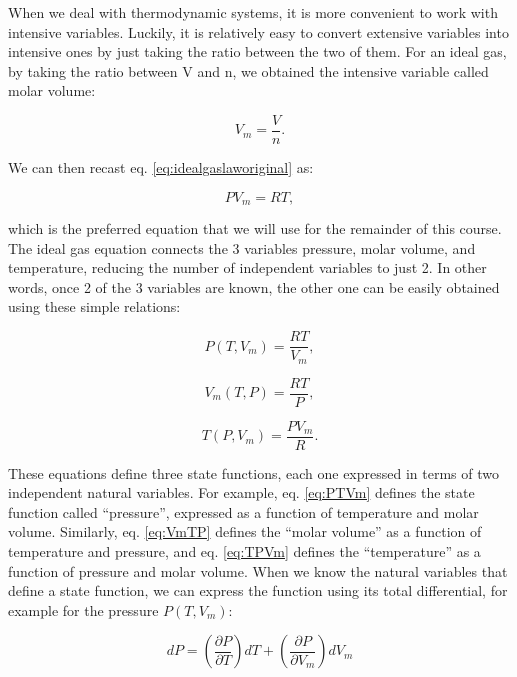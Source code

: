 \documentclass[
]{book}
\theoremstyle{definition}
\theoremstyle{definition}
\theoremstyle{definition}
\theoremstyle{remark}
\begin{document}
When we deal with thermodynamic systems, it is more convenient to work with intensive variables. Luckily, it is relatively easy to convert extensive variables into intensive ones by just taking the ratio between the two of them. For an ideal gas, by taking the ratio between V and n, we obtained the intensive variable called molar volume:

\begin{equation}
  V_m=\frac{V}{n}.   
  \label{eq:Vmdef}
\end{equation}

We can then recast eq. \eqref{eq:idealgaslaworiginal} as:

\begin{equation}
  PV_m=RT,
  \label{eq:idealgaslaw}
\end{equation}

which is the preferred equation that we will use for the remainder of this course.
The ideal gas equation connects the 3 variables pressure, molar volume, and temperature, reducing the number of independent variables to just 2. In other words, once 2 of the 3 variables are known, the other one can be easily obtained using these simple relations:

\begin{equation}
  P(T,V_m)=\frac{RT}{V_m},
  \label{eq:PTVm}
\end{equation}

\begin{equation}
  V_m(T,P)=\frac{RT}{P},
  \label{eq:VmTP}
 \end{equation}

\begin{equation}
  T(P,V_m)=\frac{PV_m}{R}.
  \label{eq:TPVm}
\end{equation}

These equations define three state functions, each one expressed in terms of two independent natural variables. For example, eq. \eqref{eq:PTVm} defines the state function called ``pressure'', expressed as a function of temperature and molar volume. Similarly, eq. \eqref{eq:VmTP} defines the ``molar volume'' as a function of temperature and pressure, and eq. \eqref{eq:TPVm} defines the ``temperature'' as a function of pressure and molar volume. When we know the natural variables that define a state function, we can express the function using its total differential, for example for the pressure \(P(T, V_m)\):

\begin{equation}
  dP=\left( \frac{\partial P}{\partial T} \right)dT + \left( \frac{\partial P}{\partial V_m} \right)dV_m
  \label{eq:totaldifferentialP}
\end{equation}
\end{document}
